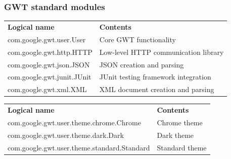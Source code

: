 \documentclass[10pt,table, xcolor=pdflatex]{beamer}
\begin{document}
\begin{frame}[fragile]\frametitle{GWT standard modules}
	\begin{footnotesize}
    	\renewcommand{\arraystretch}{1.5}
        \begin{tabular}{p{4.5cm} p{5.5cm}}
        \rowcolor{blue!20}
        \vspace{.05pt}
        \textbf{Logical name} & \vspace{.05pt} \textbf{Contents}\\[.05pt]
        \scriptsize
        com.google.gwt.user.User & Core GWT functionality\\
        com.google.gwt.http.HTTP & Low-level HTTP communication library\\
        com.google.gwt.json.JSON & JSON creation and parsing\\
        com.google.gwt.junit.JUnit & JUnit testing framework integration\\
        com.google.gwt.xml.XML & XML document creation and parsing
        \normalsize
        \end{tabular}
        
        \vspace{.5cm}
        
        \begin{tabular}{p{7cm} p{3cm}}
        \rowcolor{blue!20}
        \vspace{.05pt}
        \textbf{Logical name} & \vspace{.05pt} \textbf{Contents}\\[.05pt]
        \scriptsize
        com.google.gwt.user.theme.chrome.Chrome & Chrome theme\\
        com.google.gwt.user.theme.dark.Dark & Dark theme\\
        com.google.gwt.user.theme.standard.Standard & Standard theme
        \normalsize
        \end{tabular}
        \renewcommand{\arraystretch}{1}
	\end{footnotesize}
\end{frame}
\end{document}
